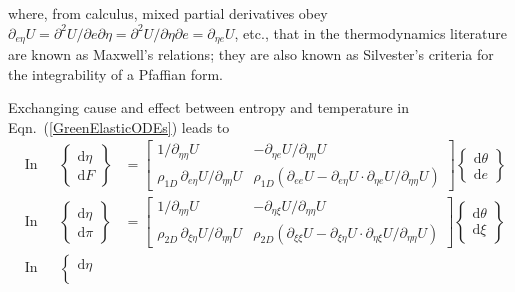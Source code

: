 where, from calculus, mixed partial derivatives obey $\partial_{e \eta} U = \partial^2 U / \partial e \partial \eta = \partial^2 U / \partial \eta \partial e = \partial_{\eta e} U$, etc., that in the thermo\-dynamics literature are known as Maxwell's relations; they are also known as Silvester's criteria for the integrability of a Pfaffian form.

Exchanging cause and effect between entropy and temperature in Eqn.~(\ref{GreenElasticODEs}) leads to
\begin{subequations}
    \label{HelmholtzElasticODEs}
    \begin{align}
    \mbox{} & \text{In 1D:} &
    \left\{ \begin{matrix} \mathrm{d} \eta \\ 
    \mathrm{d} F \end{matrix} \right\} & = \begin{bmatrix}
    1/\partial_{\eta\eta} U & -\partial_{\eta e} U / 
    \partial_{\eta\eta} U \\
    \rho_{1D} \, \partial_{e\eta} U / \partial_{\eta\eta} U & \rho_{1D} ( \partial_{ee} U - \partial_{e\eta} U \!\cdot\! \partial_{\eta e} U / \partial_{\eta\eta} U ) \end{bmatrix} 
    \left\{ \begin{matrix} \mathrm{d} \theta \\
    \mathrm{d} e \end{matrix} \right\} \\
    \mbox{} & \text{In 2D:} &
    \left\{ \begin{matrix} \mathrm{d} \eta \\ 
    \mathrm{d} \pi \end{matrix} \right\} & = \begin{bmatrix}
    1/\partial_{\eta\eta} U & -\partial_{\eta \xi} U / \partial_{\eta\eta} U \\
    \rho_{2D} \, \partial_{\xi\eta} U / \partial_{\eta\eta} U & \rho_{2D} ( \partial_{\xi\xi} U - \partial_{\xi\eta} U \!\cdot\! \partial_{\eta \xi} U / \partial_{\eta\eta} U ) \end{bmatrix} \left\{ \begin{matrix} \mathrm{d} \theta \\
    \mathrm{d} \xi \end{matrix} \right\} \label{HelmholtzMembrane} \\
    \mbox{} & \text{In 3D:} &
    \left\{ \begin{matrix} \mathrm{d} \eta \\ 

\end{matrix}
\end{align}
\end{subequations}
